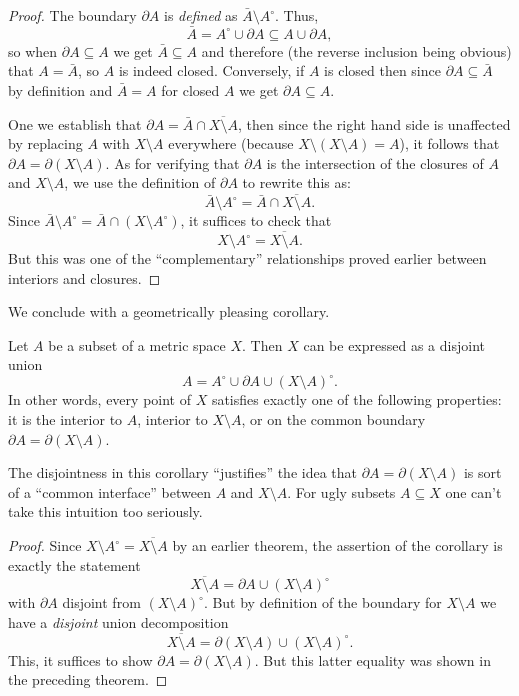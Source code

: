 \begin{proof}
  The boundary \(\partial A\) is \emph{defined} as \(\bar A\setminus
  A^\circ\). Thus,
  \[
    \bar A=A^\circ\cup\partial A\subseteq A\cup\partial A,
  \]
  so when \(\partial A\subseteq A\) we get \(\bar A\subseteq A\) and
  therefore (the reverse inclusion being obvious) that \(A=\bar A\), so
  \(A\) is indeed closed. Conversely, if \(A\) is closed then since
  \(\partial A\subseteq\bar A\) by definition and \(\bar A=A\) for closed
  \(A\) we get \(\partial A\subseteq A\).

  One we establish that \(\partial A=\bar A \cap\overline{X\setminus A}\),
  then since the right hand side is unaffected by replacing \(A\) with
  \(X\setminus A\) everywhere (because \(X\setminus (X\setminus A)=A\)), it
  follows that \(\partial A=\partial(X\setminus A)\). As for verifying that
  \(\partial A\) is the intersection of the closures of \(A\) and
  \(X\setminus A\), we use the definition of \(\partial A\) to rewrite this
  as:
  \[
    \bar A\setminus A^\circ=\bar A\cap\overline{X\setminus A}.
  \]
  Since \(\bar A\setminus A^\circ=\bar A\cap(X\setminus A^\circ)\), it
  suffices to check that
  \[
    X\setminus A^\circ=\overline{X\setminus A}.
  \]
  But this was one of the ``complementary'' relationships proved earlier
  between interiors and closures.
\end{proof}

We conclude with a geometrically pleasing corollary.

\begin{corollary}
  Let \(A\) be a subset of a metric space \(X\). Then \(X\) can be
  expressed as a disjoint union
  \[
    A=A^\circ\cup\partial A\cup{(X\setminus A)}^\circ.
  \]
  In other words, every point of \(X\) satisfies exactly one of the
  following properties: it is the interior to \(A\), interior to
  \(X\setminus A\), or on the common boundary \(\partial
  A=\partial(X\setminus A)\).
\end{corollary}

The disjointness in this corollary ``justifies'' the idea that \(\partial
A=\partial(X\setminus A)\) is sort of a ``common interface'' between \(A\)
and \(X\setminus A\). For ugly subsets \(A\subseteq X\) one can't take this
intuition too seriously.

\begin{proof}
  Since \(X\setminus A^\circ=\overline{X\setminus A}\) by an earlier
  theorem, the assertion of the corollary is exactly the statement
  \[
    \overline{X\setminus A}=\partial A\cup(X\setminus A)^\circ
  \]
  with \(\partial A\) disjoint from \({(X\setminus A)}^\circ\). But by
  definition of the boundary for \(X\setminus A\) we have a \emph{disjoint}
  union decomposition
  \[
    \overline{X\setminus A}=\partial(X\setminus A)\cup{(X\setminus A)}^\circ.
  \]
  This, it suffices to show \(\partial A=\partial (X\setminus A)\). But
  this latter equality was shown in the preceding theorem.
\end{proof}

